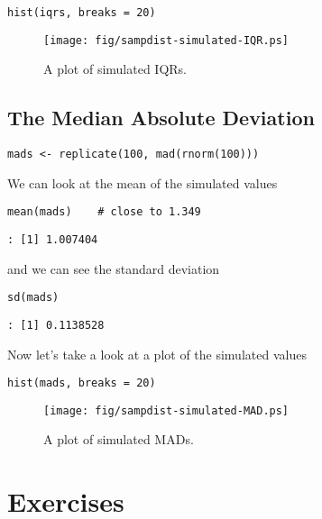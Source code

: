 \begin{verbatim}
hist(iqrs, breaks = 20)
\end{verbatim}

\begin{figure}[ht!]
\centering
\texttt{[image: fig/sampdist-simulated-IQR.ps]}
\caption[Plot of simulated IQRs]{\label{fig-simulated-IQR}\small A plot of simulated IQRs.}
\end{figure}

\subsection{The Median Absolute Deviation}
\label{sec-8-5-2}

\begin{verbatim}
mads <- replicate(100, mad(rnorm(100)))
\end{verbatim}

We can look at the mean of the simulated values

\begin{verbatim}
mean(mads)    # close to 1.349
\end{verbatim}

\begin{verbatim}
: [1] 1.007404
\end{verbatim}

and we can see the standard deviation

\begin{verbatim}
sd(mads)
\end{verbatim}

\begin{verbatim}
: [1] 0.1138528
\end{verbatim}

Now let's take a look at a plot of the simulated values

\begin{verbatim}
hist(mads, breaks = 20)
\end{verbatim}

\begin{figure}[ht!]
\centering
\texttt{[image: fig/sampdist-simulated-MAD.ps]}
\caption[Plot of simulated MADs]{\label{fig-simulated-MAD}\small A plot of simulated MADs.}
\end{figure}

\newpage{}

\section{Exercises}
\label{sec-8-6}
\setcounter{thm}{0}

